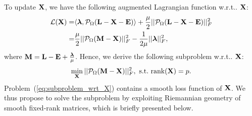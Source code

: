 \documentclass[letterpaper]{article} %
\def\calP{\mathcal{P}}
\def\bM{{\bf M}}
\def\bE{{\bf E}}
\def\blambda{{\bm \lambda}}
\def\calL{{\mathcal{L}}}
\def\bL{{\bf L}}
\def\bX{{\bf X}}
\def\bX{{\bf X}}
\def\st{{\text{s.t.}}}
\def\wrt{\emph{w.r.t}}
\def\rank{{\text{rank}}}
\def\wrt{w.r.t.} \def\dof{d.o.f.}
\begin{document}
To update $\bX$, we have the following augmented Lagrangian function \wrt. $\bX$:
{\small
\begin{align}\label{eq:langrangian_wrt_X}
  \calL (\bX) = & \langle \blambda, \calP_{\Omega} (\bL - \bX - \bE) \rangle + \frac{\mu}{2} || \calP_{\Omega} (\bL - \bX - \bE) ||_F^2  \nonumber  \\
              = & \frac{\mu}{2} || \calP_{\Omega} (\bM - \bX) ||_F^2 - \frac{1}{2\mu}|| \blambda ||_F^2   ,
\end{align}
}
\noindent
where $\bM = \bL - \bE + \frac{\blambda}{\mu}$.
Hence, we derive the following subproblem \wrt. $\bX$:
{\small
\begin{align}\label{eq:subproblem_wrt_X}
  \min_{\bX} || \calP_{\Omega} (\bM - \bX) ||_F^2,~ \st~ \rank(\bX) = p.
\end{align}
}
\noindent
Problem~(\ref{eq:subproblem_wrt_X}) contains a smooth loss function of $\bX$.
We thus propose to solve the subproblem by exploiting Riemannian geometry of smooth fixed-rank matrices, which is briefly presented below.
\end{document}
